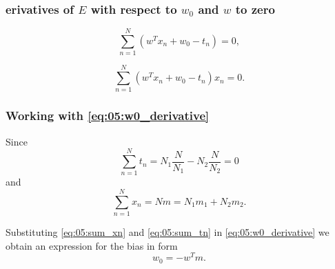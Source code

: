 \begin{frame}
    \frametitle{erivatives of $E$ with respect to $w_0$ and $w$ to zero}
    \begin{equation}\label{eq:05:w0_derivative}
        \sum_{n = 1}^N (w^T x_n + w_0 - t_n) = 0,
    \end{equation}

    \begin{equation}
        \sum_{n = 1}^N (w^T x_n + w_0 - t_n)x_n = 0.
    \end{equation}
\end{frame}

\begin{frame}
    \frametitle{Working with \ref{eq:05:w0_derivative}}

    Since 
    \begin{equation} \label{eq:05:sum_tn}
        \sum_{n = 1}^N t_n 
        = 
        N_1 \frac{N}{N_1} 
        - 
        N_2 \frac{N}{N_2}
        = 0
    \end{equation}
    and 
    \begin{equation} \label{eq:05:sum_xn}
        \sum_{n = 1}^N x_n 
        = N m
        = N_1 m_1 + N_2 m_2.
    \end{equation}

   Substituting  \ref{eq:05:sum_xn} and   \ref{eq:05:sum_tn} in \ref{eq:05:w0_derivative}
   we obtain an expression for the bias in form 
   \begin{equation}
    w_0 = -w^T m.
   \end{equation}
    

\end{frame}



